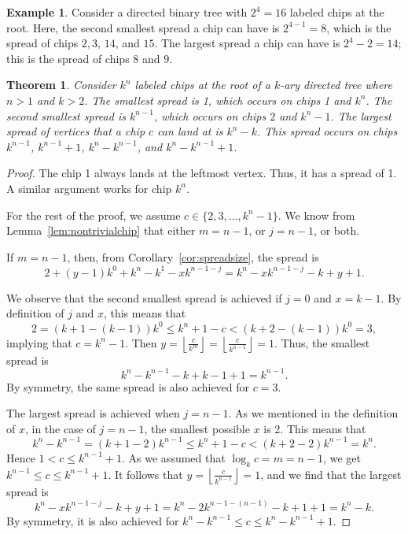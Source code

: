 \documentclass[11pt]{article}
\newtheorem{theorem}{Theorem}[section] %
\theoremstyle{definition}
\newtheorem{example}{Example}
\theoremstyle{remark}
\newcommand{\floor}[1]{\left\lfloor #1 \right\rfloor}
\begin{document}
\begin{example}
    Consider a directed binary tree with $2^4=16$ labeled chips at the root. Here, the second smallest spread a chip can have is $2^{4-1}=8$, which is the spread of chips $2, 3$, $14$, and $15$. The largest spread a chip can have is $2^4-2 = 14$; this is the spread of chips $8$ and $9$.
\end{example}

\begin{theorem}\label{thm:SmallestBiggestSpread}
    Consider $k^n$ labeled chips at the root of a $k$-ary directed tree where $n > 1$ and $k > 2$. The smallest spread is 1, which occurs on chips 1 and $k^n$. The second smallest spread is $k^{n-1}$, which occurs on chips $2$ and $k^n -1$. The largest spread of vertices that a chip $c$ can land at is $k^n-k$. This spread occurs on chips $k^{n-1}$, $k^{n-1}+1$, $k^n - k^{n-1}$, and $k^{n}-k^{n-1}+1$.
\end{theorem}

\begin{proof}
    The chip 1 always lands at the leftmost vertex. Thus, it has a spread of 1. A similar argument works for chip $k^n$. 

For the rest of the proof, we assume $c \in \{2, 3, \dots, k^n-1\}$. We know from Lemma~\ref{lem:nontrivialchip} that either $m = n-1$, or $j = n-1$, or both.

If $m = n-1$, then, from Corollary~\ref{cor:spreadsize}, the spread is
\[2+(y-1)k^{0}+k^n - k^{1} - xk^{n-1-j} = k^n - xk^{n-1-j} -k + y + 1.\]

We observe that the second smallest spread is achieved if $j = 0$ and $x = k-1$. By definition of $j$ and $x$, this means that
\[2 = (k+1 - (k-1)) k^0 \leq k^n+1-c < (k+2 - (k-1))k^0 = 3,\]
implying that $c = k^n -1$. Then $y = \left \lfloor \frac{c}{k^m} \right \rfloor = \left \lfloor \frac{c}{k^{n-1}} \right \rfloor  = 1$. Thus, the smallest spread is
\[k^n - k^{n-1} -k + k-1 + 1 = k^{n-1}.\]
By symmetry, the same spread is also achieved for $c = 3$.

The largest spread is achieved when $j=n-1$. As we mentioned in the definition of $x$, in the case of $j=n-1$, the smallest possible $x$ is 2. This means that
\[k^n - k^{n-1} = (k+1 - 2) k^{n-1} \leq k^n+1-c < (k+2 - 2)k^{n-1} = k^n.\]
Hence $1 < c \leq k^{n-1}+1$. As we assumed that $\log_k c = m= n-1$, we get $k^{n-1} \leq c \leq k^{n-1}+1$. It follows that $y = \floor{\frac{c}{k^{n-1}}} =1$, and we find that the largest spread is
\[k^n - xk^{n-1-j} -k + y + 1  = k^n - 2k^{n-1-(n-1)} -k + 1 +1 = k^n - k.\]
By symmetry, it is also achieved for $k^n - k^{n-1} \leq c \leq k^{n}-k^{n-1}+1$.
\end{proof}
\end{document}
